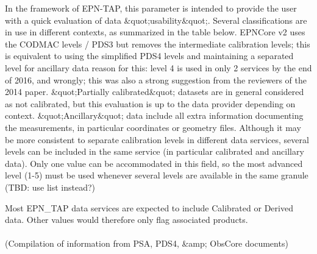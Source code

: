 \documentclass[11pt,a4paper]{ivoa}
\begin{document}
In the framework of EPN-TAP, this parameter is intended to provide the user with a quick evaluation of data \&quot;usability\&quot;. Several classifications are in use in different contexts, as summarized in the table below.  EPNCore v2 uses the CODMAC levels / PDS3 but removes the intermediate calibration levels; this is equivalent to using the simplified PDS4 levels and maintaining a separated level for ancillary data {reason for this: level 4 is used in only 2 services by the end of 2016, and wrongly; this was also a strong suggestion from the reviewers of the 2014 paper}. \&quot;Partially calibrated\&quot; datasets are in general considered as not calibrated, but this evaluation is up to the data provider depending on context. \&quot;Ancillary\&quot; data include all extra information documenting the measurements, in particular coordinates or geometry files. Although it may be more consistent to separate calibration levels in different data services, several levels can be included in the same service (in particular calibrated and ancillary data). Only one value can be accommodated in this field, so the most advanced level (1-5) must be used whenever several levels are available in the same granule (TBD: use list instead?)

Most EPN\_TAP data services are expected to include Calibrated or Derived data. Other values would therefore only flag associated products.\\ \\ (Compilation of information from PSA, PDS4, \&amp; ObsCore documents)
\end{document}

